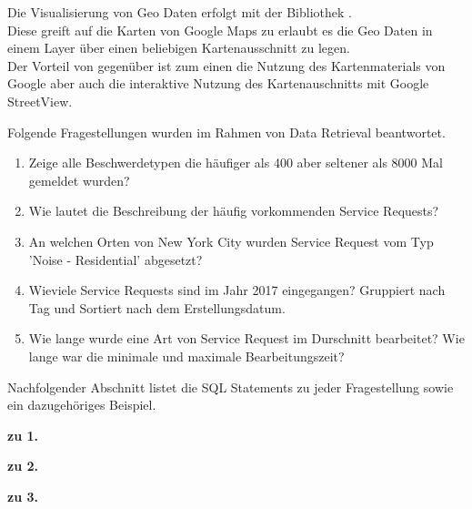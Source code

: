  Die Visualisierung von Geo Daten erfolgt mit der Bibliothek .\\
 Diese greift auf die Karten von Google Maps zu erlaubt es die Geo Daten in einem Layer über einen
 beliebigen Kartenausschnitt zu legen.\\
 Der Vorteil von  gegenüber  ist
 zum einen die Nutzung des Kartenmaterials von Google aber auch die interaktive Nutzung
 des Kartenauschnitts mit \zb{} Google StreetView.

Folgende Fragestellungen wurden im Rahmen von Data Retrieval beantwortet.

\begin{enumerate}
  \item Zeige alle Beschwerdetypen die häufiger als 400 aber seltener als 8000 Mal gemeldet wurden?
  \item Wie lautet die Beschreibung der häufig vorkommenden Service Requests?
  \item An welchen Orten von New York City wurden Service Request vom Typ 'Noise - Residential' abgesetzt?
  \item Wieviele Service Requests sind im Jahr 2017 eingegangen? Gruppiert nach Tag und Sortiert nach dem Erstellungsdatum.
  \item Wie lange wurde eine Art von Service Request im Durschnitt bearbeitet? Wie lange war die minimale und maximale Bearbeitungszeit?
\end{enumerate}

Nachfolgender Abschnitt listet die \ac{SQL} Statements zu jeder Fragestellung sowie ein dazugehöriges Beispiel.

\textbf{zu 1.}
\newline
{}


\textbf{zu 2.}
\newline
{}


\textbf{zu 3.}
\newline
{}

